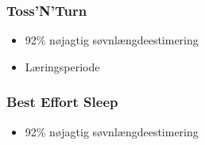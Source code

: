 \begin{frame}
\frametitle{Toss'N'Turn}
\begin{itemize}
	\item 92\% nøjagtig søvnlængdeestimering
	\item Læringsperiode
\end{itemize}
\end{frame}

\begin{frame}
	\frametitle{Best Effort Sleep}
	\begin{itemize}
		\item 92\% nøjagtig søvnlængdeestimering
	\end{itemize}
\end{frame}

